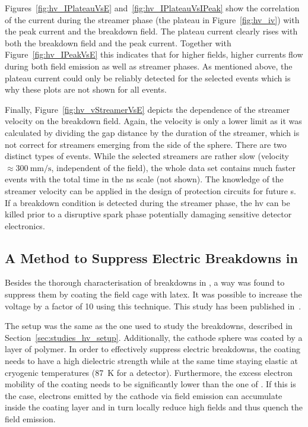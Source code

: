 Figures~\ref{fig:hv_IPlateauVsE} and~\ref{fig:hv_IPlateauVsIPeak} show the correlation of the current during the streamer phase (the plateau in Figure~\ref{fig:hv_iv}) with the peak current and the breakdown field.
The plateau current clearly rises with both the breakdown field and the peak current.
Together with Figure~\ref{fig:hv_IPeakVsE} this indicates that for higher fields, higher currents flow during both field emission as well as streamer phases.
As mentioned above, the plateau current could only be reliably detected for the selected events which is why these plots are not shown for all events.

Finally, Figure~\ref{fig:hv_vStreamerVsE} depicts the dependence of the streamer velocity on the breakdown field.
Again, the velocity is only a lower limit as it was calculated by dividing the gap distance by the duration of the streamer, which is not correct for streamers emerging from the side of the sphere.
There are two distinct types of events.
While the selected streamers are rather slow (velocity $\approx \SI{300}{\milli\metre\per\second}$, independent of the field), the whole data set contains much faster events with the total time in the ns scale (not shown).
The knowledge of the streamer velocity can be applied in the design of protection circuits for future \lartpc{}s.
If a breakdown condition is detected during the streamer phase, the \gls{hv} can be killed prior to a disruptive spark phase potentially damaging sensitive detector electronics.


\subsection{A Method to Suppress Electric Breakdowns in }
\label{sec:studies_hv_latex}

Besides the thorough characterisation of breakdowns in \lar{}, a way was found to suppress them by coating the field cage with latex.
It was possible to increase the voltage by a factor of \num{10} using this technique.
This study has been published in~\cite{latex}.

The setup was the same as the one used to study the breakdowns, described in Section~\ref{sec:studies_hv_setup}.
Additionally, the cathode sphere was coated by a layer of polymer.
In order to effectively suppress electric breakdowns, the coating needs to have a high dielectric strength while at the same time staying elastic at cryogenic temperatures (\SI{87}{\kelvin} for a \lar{} detector).
Furthermore, the excess electron mobility of the coating needs to be significantly lower than the one of \lar{}.
If this is the case, electrons emitted by the cathode via field emission can accumulate inside the coating layer and in turn locally reduce high fields and thus quench the field emission.

